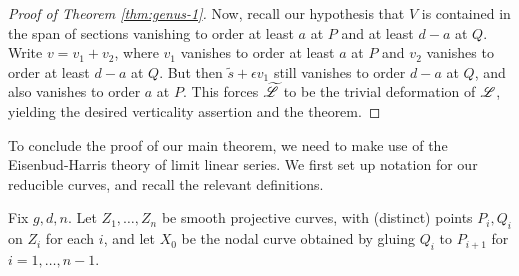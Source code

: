 \documentclass{amsart}
\begin{document}
\begin{proof}[Proof of Theorem \ref{thm:genus-1}]
Now, recall our hypothesis that $V$ is contained in the 
span of sections vanishing to order at least $a$ at $P$ and at least $d-a$ at $Q$.
Write $v=v_1 + v_2$, where $v_1$ vanishes to order at least $a$ at 
$P$ and $v_2$ vanishes to order at least $d-a$ at $Q$. But then 
$\tilde{s}+ \epsilon v_1$ still vanishes to order $d-a$ at $Q$, and also vanishes to 
order $a$ at $P$. This forces $\widetilde{{\mathscr L}}$ to be the trivial deformation of ${\mathscr L}$,
yielding the desired verticality
assertion and the theorem.
\end{proof}

% 
To conclude the proof of our main theorem, we need to make use of the
Eisenbud-Harris theory of limit linear series. We first set up notation
for our reducible curves, and recall the relevant definitions.

\begin{sit}\label{sit:chain} Fix $g,d,n$. Let $Z_1,\dots,Z_n$
be smooth projective curves, with (distinct) points $P_i, Q_i$ on $Z_i$ for each
$i$, and let $X_0$ be the nodal curve obtained by gluing $Q_i$ to $P_{i+1}$ 
for $i=1,\dots,n-1$.
\end{sit}
\end{document}
